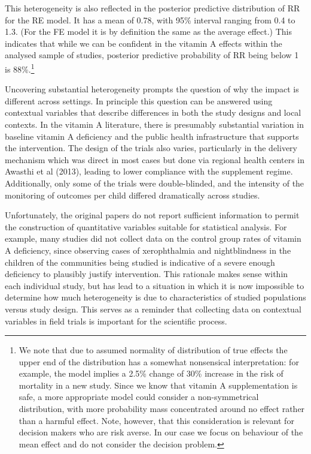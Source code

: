 \documentclass[12pt]{article}
\begin{document}
This heterogeneity is also reflected in the posterior predictive distribution of RR for the RE model. It has a mean of 0.78, with 95\% interval ranging from 0.4 to 1.3. (For the FE model it is by definition the same as the average effect.) This indicates that while we can be confident in the vitamin A effects within the analysed sample of studies, posterior predictive probability of RR being below 1 is 88\%.\footnote{We note that due to assumed normality of distribution of true effects the upper end of the distribution has a somewhat nonsensical interpretation: for example, the model implies a 2.5\% change of 30\% increase in the risk of mortality in a new study. Since we know that vitamin A supplementation is safe, a more appropriate model could consider a non-symmetrical distribution, with more probability mass concentrated around no effect rather than a harmful effect. Note, however, that this consideration is relevant for decision makers who are risk averse. In our case we focus on behaviour of the mean effect and do not consider the decision problem.}

Uncovering substantial heterogeneity prompts the question of why the impact is different across settings. In principle this question can be answered using contextual variables that describe differences in both the study designs and local contexts. In the vitamin A literature, there is presumably substantial variation in baseline vitamin A deficiency and the public health infrastructure that supports the intervention. The design of the trials also varies, particularly in the delivery mechanism which was direct in most cases but done via regional health centers in Awasthi et al (2013), leading to lower compliance with the supplement regime. Additionally, only some of the trials were double-blinded, and the intensity of the monitoring of outcomes per child differed dramatically across studies. 

Unfortunately, the original papers do not report sufficient information to permit the construction of quantitative variables suitable for statistical analysis. For example, many studies did not collect data on the control group rates of vitamin A deficiency, since observing cases of xerophthalmia and nightblindness in the children of the communities being studied is indicative of a severe enough deficiency to plausibly justify intervention. This rationale makes sense within each individual study, but has lead to a situation in which it is now impossible to determine how much heterogeneity is due to characteristics of studied populations versus study design. This serves as a reminder that collecting data on contextual variables in field trials is important for the scientific process. 
\end{document}
